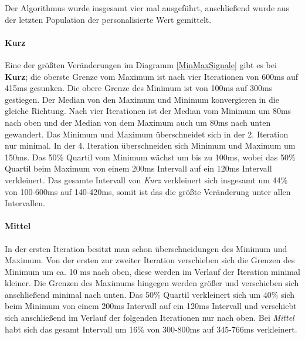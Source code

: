 
Der Algorithmus wurde insgesamt vier mal ausgef{\"u}hrt, anschlie{\ss}end wurde aus der letzten Population der personalisierte Wert gemittelt. 

\paragraph{Kurz}
Eine der gr{\"o}{\ss}ten Ver{\"a}nderungen im Diagramm \autoref{MinMaxSignale} gibt es bei \textbf{Kurz}; die oberste Grenze vom Maximum ist nach vier Iterationen von 600ms auf 415ms gesunken. 
Die obere Grenze des Minimum ist von 100ms auf 300ms gestiegen. 
Der Median von den Maximum und Minimum konvergieren in die gleiche Richtung. 
Nach vier Iterationen ist der Median vom Minimum um 80ms nach oben und der Median von dem Maximum auch um 80ms nach unten gewandert. 
Das Minimum und Maximum {\"u}berschneidet sich in der 2. Iteration nur minimal. 
In der 4. Iteration {\"u}berschneiden sich Minimum und Maximum um 150ms. 
Das 50\% Quartil vom Minimum w{\"a}chst um bis zu 100ms, wobei das 50\% Quartil beim Maximum von einem 200ms Intervall auf ein 120ms Intervall verkleinert. 
Das gesamte Intervall von \textit{Kurz} verkleinert sich insgesamt um 44\% von 100-600ms auf 140-420ms, somit ist das die gr{\"o}{\ss}te Ver{\"a}nderung unter allen Intervallen.



\paragraph{Mittel}
In der ersten Iteration besitzt man schon {\"u}berschneidungen des Minimum und Maximum. 
Von der ersten zur zweiter Iteration verschieben sich die Grenzen des Minimum um ca. 10 ms nach oben, diese werden im Verlauf der Iteration minimal kleiner.  
Die Grenzen des Maximums hingegen werden gr{\"o}{\ss}er und verschieben sich anschlie{\ss}end minimal nach unten. 
Das 50\% Quartil verkleinert sich um 40\% sich beim Minimum von einem 200ms Intervall auf ein 120ms Intervall und verschiebt sich anschlie{\ss}end im Verlauf der folgenden Iterationen nur nach oben. 
Bei \textit{Mittel} habt sich das gesamt Intervall um 16\% von 300-800ms auf 345-766ms verkleinert.



